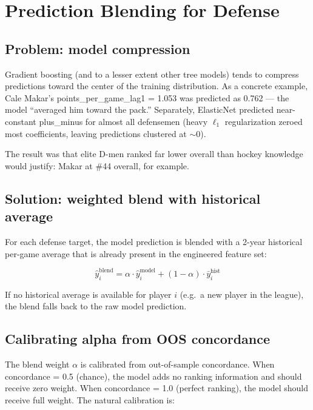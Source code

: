 \documentclass[11pt, a4paper]{article}
\begin{document}
\section{Prediction Blending for Defense}
\label{sec:blending}

\subsection{Problem: model compression}

Gradient boosting (and to a lesser extent other tree models) tends to compress predictions
toward the center of the training distribution. As a concrete example, Cale Makar's
points\_per\_game\_lag1 = 1.053 was predicted as 0.762 — the model ``averaged him toward the
pack.'' Separately, ElasticNet predicted near-constant plus\_minus for almost all defensemen
(heavy $\ell_1$ regularization zeroed most coefficients, leaving predictions clustered at
$\sim$0).

The result was that elite D-men ranked far lower overall than hockey knowledge would justify:
Makar at \#44 overall, for example.

\subsection{Solution: weighted blend with historical average}

For each defense target, the model prediction is blended with a 2-year historical per-game
average that is already present in the engineered feature set:

\begin{equation}
  \hat{y}_i^{\text{blend}} = \alpha \cdot \hat{y}_i^{\text{model}} + (1-\alpha) \cdot \bar{y}_i^{\text{hist}}
  \label{eq:blend}
\end{equation}

If no historical average is available for player $i$ (e.g.\ a new player in the league),
the blend falls back to the raw model prediction.

\subsection{Calibrating alpha from OOS concordance}

The blend weight $\alpha$ is calibrated from out-of-sample concordance. When concordance = 0.5
(chance), the model adds no ranking information and should receive zero weight.
When concordance = 1.0 (perfect ranking), the model should receive full weight.
The natural calibration is:
\end{document}
